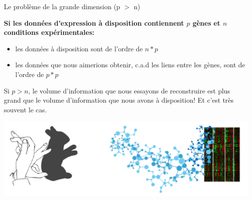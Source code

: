 \begin{frame}{Le problème de la grande dimension (p $>$ n) }


\small \textbf{Si les données d'expression à disposition contiennent $p$ gènes et $n$ conditions expérimentales:}

\begin{itemize} \small 
    \item les données à disposition sont de l'ordre de $n*p$
    \item les données que nous aimerions obtenir, c.a.d les liens entre les gènes, sont de l'ordre de  $p*p$
\end{itemize}

Si $p>n$, le volume d'information que nous essayons de reconstruire est plus grand que le volume d'information que nous avons à disposition! Et c'est très souvent le cas.

\center
\includegraphics[scale = 0.2]{Figures/Intro/shadowplay.png}
    
\end{frame}

